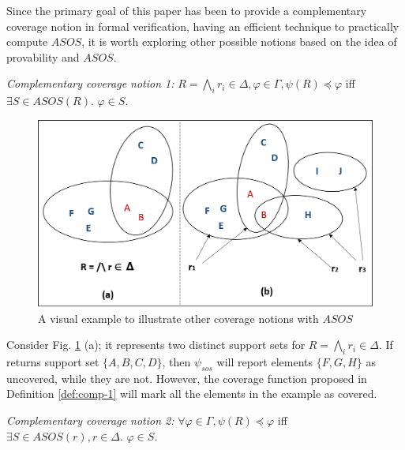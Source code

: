 Since the primary goal of
 this paper has been to provide a complementary coverage notion in
  formal verification, having an efficient technique to practically compute $ASOS$, it is worth exploring other possible notions based on the idea of provability and $ASOS$.

\begin{definition} {\emph{Complementary coverage notion 1:}}
  \label{def:comp-1}
   $ R = \bigwedge_{i} {r_i \in \Delta}, \varphi \in \Gamma,  \psi (R) \preccurlyeq \varphi$ iff $ \exists S
   \in ASOS(R)$. $\varphi \in S$.
\end{definition}

\begin{figure}
\begin{center}
\includegraphics[width=\columnwidth]{figs/disc.png}
\vspace{-0.1in}
\caption{A visual example to illustrate other coverage notions with $ASOS$}\label{fig:disc}
\end{center}
\end{figure}

Consider Fig. \ref{fig:disc} (a); it represents two distinct support sets for $ R = \bigwedge_{i} {r_i \in \Delta}$. If \ucalg returns support set $\{ A, B, C, D\}$, then $\psi_{sos}$ will
report elements $\{ F, G, H\}$ as uncovered, while they are not. However,
the coverage function proposed in Definition \ref{def:comp-1} will mark all the elements in the example as covered.

\begin{definition} {\emph{Complementary coverage notion 2:}}
  \label{def:comp-2}
   $\forall \varphi \in \Gamma,  \psi (R) \preccurlyeq \varphi$ iff $ \exists S
   \in ASOS(r), r \in \Delta$. $\varphi \in S$.
\end{definition}

